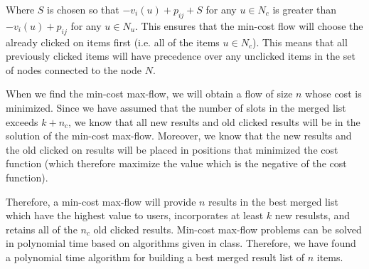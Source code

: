 \documentclass[psamsfonts]{amsart}
\newenvironment{sol}{\vspace{0.25cm}{\large \bfseries Solution:}}{\qedsymbol}
\begin{document}
\begin{sol}
Where $S$ is chosen so that $-v_i(u) + p_{ij} + S$ for any $u \in N_c$ is greater than $-v_i(u) + p_{ij}$ for any $u \in N_u$. This ensures that the min-cost flow will choose the already clicked on items first (i.e. all of the items $u \in N_c$). This means that all previously clicked items will have precedence over any unclicked items in the set of nodes connected to the node $N$. 

When we find the min-cost max-flow, we will obtain a flow of size $n$ whose cost is minimized. Since we have assumed that the number of slots in the merged list exceeds $k + n_c$, we know that all new results and old clicked results will be in the solution of the min-cost max-flow. Moreover, we know that the new results and the old clicked on results will be placed in positions that minimized the cost function (which therefore maximize the value which is the negative of the cost function).

Therefore, a min-cost max-flow will provide $n$ results in the best merged list which have the highest value to users, incorporates at least $k$ new resulsts, and retains all of the $n_c$ old clicked results. Min-cost max-flow problems can be solved in polynomial time based on algorithms given in class. Therefore, we have found a polynomial time algorithm for building a best merged result list of $n$ items.
\end{sol}
\end{document}
